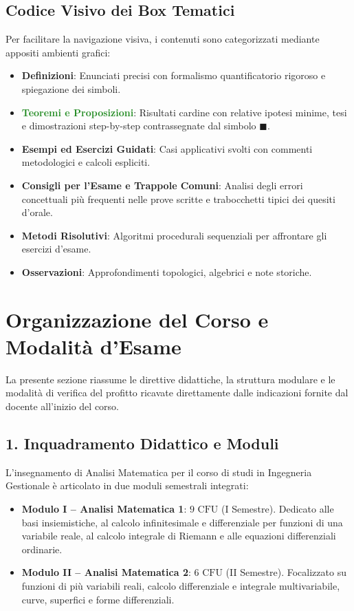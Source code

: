 \documentclass[11pt,a4paper,twoside,openright]{book}
\begin{document}
\section*{Codice Visivo dei Box Tematici}
Per facilitare la navigazione visiva, i contenuti sono categorizzati mediante appositi ambienti grafici:
\begin{itemize}
    \item \textbf{\textcolor{navyblue}{Definizioni}}: Enunciati precisi con formalismo quantificatorio rigoroso e spiegazione dei simboli.
    \item \textbf{\textcolor{forestgreen}{Teoremi e Proposizioni}}: Risultati cardine con relative ipotesi minime, tesi e dimostrazioni step-by-step contrassegnate dal simbolo $\blacksquare$.
    \item \textbf{\textcolor{purpleaccent}{Esempi ed Esercizi Guidati}}: Casi applicativi svolti con commenti metodologici e calcoli espliciti.
    \item \textbf{\textcolor{crimsonred}{Consigli per l'Esame e Trappole Comuni}}: Analisi degli errori concettuali più frequenti nelle prove scritte e trabocchetti tipici dei quesiti d'orale.
    \item \textbf{\textcolor{warmamber}{Metodi Risolutivi}}: Algoritmi procedurali sequenziali per affrontare gli esercizi d'esame.
    \item \textbf{\textcolor{navyblue!80}{Osservazioni}}: Approfondimenti topologici, algebrici e note storiche.
\end{itemize}

\cleardoublepage

\chapter*{Organizzazione del Corso e Modalità d'Esame}

La presente sezione riassume le direttive didattiche, la struttura modulare e le modalità di verifica del profitto ricavate direttamente dalle indicazioni fornite dal docente all'inizio del corso.

\section*{1. Inquadramento Didattico e Moduli}
L'insegnamento di Analisi Matematica per il corso di studi in Ingegneria Gestionale è articolato in due moduli semestrali integrati:
\begin{itemize}
    \item \textbf{Modulo I -- Analisi Matematica 1}: $9\text{ CFU}$ (I Semestre). Dedicato alle basi insiemistiche, al calcolo infinitesimale e differenziale per funzioni di una variabile reale, al calcolo integrale di Riemann e alle equazioni differenziali ordinarie.
    \item \textbf{Modulo II -- Analisi Matematica 2}: $6\text{ CFU}$ (II Semestre). Focalizzato su funzioni di più variabili reali, calcolo differenziale e integrale multivariabile, curve, superfici e forme differenziali.
\end{itemize}
\end{document}
